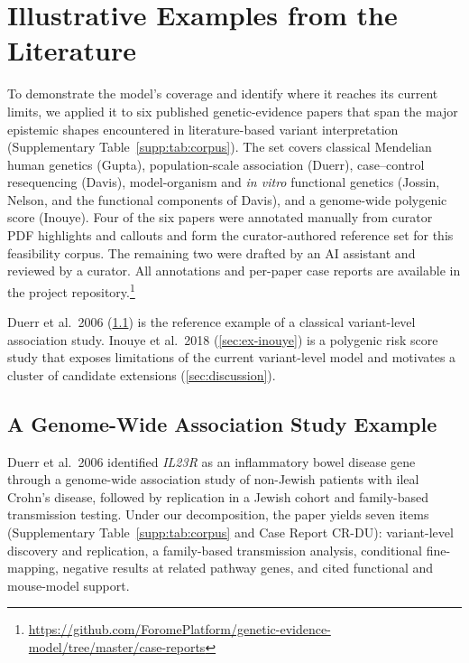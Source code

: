 %
%

\section{Illustrative Examples from the Literature}
\label{sec:examples}

To demonstrate the model's coverage and identify where it reaches its
current limits, we applied it to six published genetic-evidence papers that
span the major epistemic shapes encountered in literature-based variant
interpretation (Supplementary Table~\ref*{supp:tab:corpus}). The set covers
classical Mendelian human genetics (Gupta), population-scale association
(Duerr), case--control resequencing (Davis), model-organism and \emph{in
vitro} functional genetics (Jossin, Nelson, and the functional components of
Davis), and a genome-wide polygenic score (Inouye). Four of the six papers
were annotated manually from curator PDF highlights and callouts and form
the curator-authored reference set for this feasibility corpus. The remaining two were drafted by an AI assistant
and reviewed by a curator. All annotations and per-paper case reports are
available in the project
repository.\footnote{\url{https://github.com/ForomePlatform/genetic-evidence-model/tree/master/case-reports}}

Duerr et al.\ 2006 (\cref{sec:ex-duerr}) is the reference example of a
classical variant-level association study. Inouye et al.\ 2018
(\cref{sec:ex-inouye}) is a polygenic risk score study that exposes
limitations of the current variant-level model and motivates a cluster of
candidate extensions (\cref{sec:discussion}).

\subsection{A Genome-Wide Association Study Example}
\label{sec:ex-duerr}

Duerr et al.\ 2006 identified \textit{IL23R} as an inflammatory bowel
disease gene through a genome-wide association study of non-Jewish patients
with ileal Crohn's disease, followed by replication in a Jewish cohort and
family-based transmission testing. Under our decomposition, the paper yields
seven \GeneticEvidence{} items (Supplementary
Table~\ref*{supp:tab:corpus} and Case Report CR-DU): variant-level discovery
and replication, a family-based transmission analysis, conditional
fine-mapping, negative results at related pathway genes, and cited
functional and mouse-model support.


